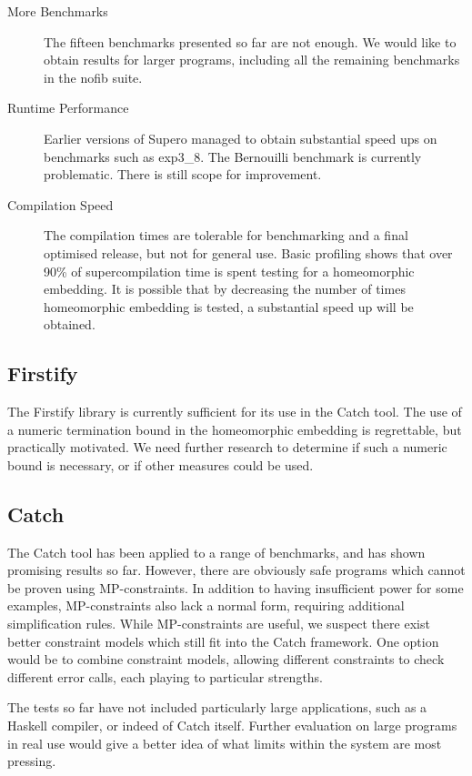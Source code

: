 \begin{description}
\item[More Benchmarks] The fifteen benchmarks presented so far are not enough. We would like to obtain results for larger programs, including all the remaining benchmarks in the nofib suite.
\item[Runtime Performance] Earlier versions of Supero \cite{me:supero_ifl} managed to obtain substantial speed ups on benchmarks such as exp3\_8. The Bernouilli benchmark is currently problematic. There is still scope for improvement.
\item[Compilation Speed] The compilation times are tolerable for benchmarking and a final optimised release, but not for general use. Basic profiling shows that over 90\% of supercompilation time is spent testing for a homeomorphic embedding. It is possible that by decreasing the number of times homeomorphic embedding is tested, a substantial speed up will be obtained.
\end{description}

\subsection{Firstify}

The Firstify library is currently sufficient for its use in the Catch tool. The use of a numeric termination bound in the homeomorphic embedding is regrettable, but practically motivated. We need further research to determine if such a numeric bound is necessary, or if other measures could be used.

\subsection{Catch}

The Catch tool has been applied to a range of benchmarks, and has shown promising results so far. However, there are obviously safe programs which cannot be proven using MP-constraints. In addition to having insufficient power for some examples, MP-constraints also lack a normal form, requiring additional simplification rules. While MP-constraints are useful, we suspect there exist better constraint models which still fit into the Catch framework. One option would be to combine constraint models, allowing different constraints to check different error calls, each playing to particular strengths.

The tests so far have not included particularly large applications, such as a Haskell compiler, or indeed of Catch itself. Further evaluation on large programs in real use would give a better idea of what limits within the system are most pressing.

